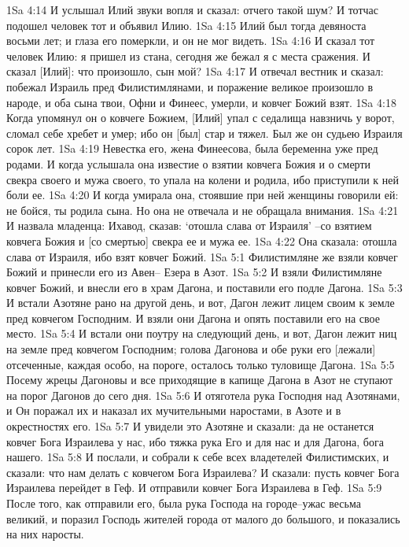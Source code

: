 1Sa 4:14  И услышал Илий звуки вопля и сказал: отчего такой шум? И тотчас подошел человек тот и объявил Илию.
1Sa 4:15  Илий был тогда девяноста восьми лет; и глаза его померкли, и он не мог видеть.
1Sa 4:16  И сказал тот человек Илию: я пришел из стана, сегодня же бежал я с места сражения. И сказал [Илий]: что произошло, сын мой?
1Sa 4:17  И отвечал вестник и сказал: побежал Израиль пред Филистимлянами, и поражение великое произошло в народе, и оба сына твои, Офни и Финеес, умерли, и ковчег Божий взят.
1Sa 4:18  Когда упомянул он о ковчеге Божием, [Илий] упал с седалища навзничь у ворот, сломал себе хребет и умер; ибо он [был] стар и тяжел. Был же он судьею Израиля сорок лет.
1Sa 4:19  Невестка его, жена Финеесова, была беременна уже пред родами. И когда услышала она известие о взятии ковчега Божия и о смерти свекра своего и мужа своего, то упала на колени и родила, ибо приступили к ней боли ее.
1Sa 4:20  И когда умирала она, стоявшие при ней женщины говорили ей: не бойся, ты родила сына. Но она не отвечала и не обращала внимания.
1Sa 4:21  И назвала младенца: Ихавод, сказав: `отошла слава от Израиля' --со взятием ковчега Божия и [со смертью] свекра ее и мужа ее.
1Sa 4:22  Она сказала: отошла слава от Израиля, ибо взят ковчег Божий.
1Sa 5:1  Филистимляне же взяли ковчег Божий и принесли его из Авен-- Езера в Азот.
1Sa 5:2  И взяли Филистимляне ковчег Божий, и внесли его в храм Дагона, и поставили его подле Дагона.
1Sa 5:3  И встали Азотяне рано на другой день, и вот, Дагон лежит лицем своим к земле пред ковчегом Господним. И взяли они Дагона и опять поставили его на свое место.
1Sa 5:4  И встали они поутру на следующий день, и вот, Дагон лежит ниц на земле пред ковчегом Господним; голова Дагонова и обе руки его [лежали] отсеченные, каждая особо, на пороге, осталось только туловище Дагона.
1Sa 5:5  Посему жрецы Дагоновы и все приходящие в капище Дагона в Азот не ступают на порог Дагонов до сего дня.
1Sa 5:6  И отяготела рука Господня над Азотянами, и Он поражал их и наказал их мучительными наростами, в Азоте и в окрестностях его.
1Sa 5:7  И увидели это Азотяне и сказали: да не останется ковчег Бога Израилева у нас, ибо тяжка рука Его и для нас и для Дагона, бога нашего.
1Sa 5:8  И послали, и собрали к себе всех владетелей Филистимских, и сказали: что нам делать с ковчегом Бога Израилева? И сказали: пусть ковчег Бога Израилева перейдет в Геф. И отправили ковчег Бога Израилева в Геф.
1Sa 5:9  После того, как отправили его, была рука Господа на городе--ужас весьма великий, и поразил Господь жителей города от малого до большого, и показались на них наросты.

